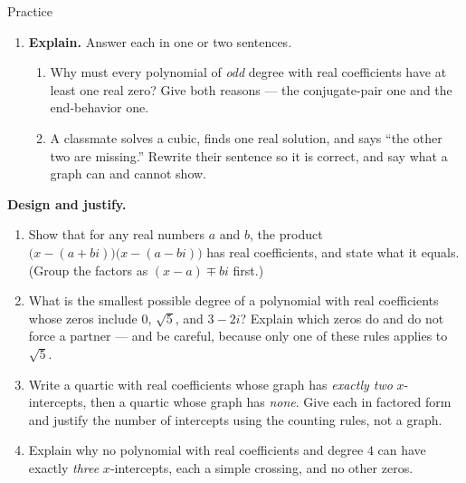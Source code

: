 \documentclass[10pt]{article}
\begin{document}
\begin{notesbox}{Practice}
\begin{enumerate}[leftmargin=1.9em, itemsep=8pt]
  \item \textbf{Explain.} Answer each in one or two sentences.
    \begin{enumerate}[label=(\alph*), leftmargin=1.8em, itemsep=5pt]
      \item Why must every polynomial of \emph{odd} degree with real coefficients have at least one
        real zero? Give both reasons --- the conjugate-pair one and the end-behavior one.
      \item A classmate solves a cubic, finds one real solution, and says ``the other two are
        missing.'' Rewrite their sentence so it is correct, and say what a graph can and cannot show.
    \end{enumerate}
\end{enumerate}
\end{notesbox}

\begin{extensionbox}
\textbf{Design and justify.}
\begin{enumerate}[label=(\alph*), leftmargin=1.8em, itemsep=5pt]
  \item Show that for any real numbers $a$ and $b$, the product
        $\big(x-(a+bi)\big)\big(x-(a-bi)\big)$ has real coefficients, and state what it equals.
        (Group the factors as $(x-a) \mp bi$ first.)
  \item What is the smallest possible degree of a polynomial with real coefficients whose zeros
        include $0$, $\sqrt{5}$, and $3-2i$? Explain which zeros do and do not force a partner ---
        and be careful, because only one of these rules applies to $\sqrt{5}$.
  \item Write a quartic with real coefficients whose graph has \emph{exactly two} $x$-intercepts,
        then a quartic whose graph has \emph{none}. Give each in factored form and justify the number
        of intercepts using the counting rules, not a graph.
  \item Explain why no polynomial with real coefficients and degree $4$ can have exactly \emph{three}
        $x$-intercepts, each a simple crossing, and no other zeros.
\end{enumerate}
\end{extensionbox}
\end{document}
